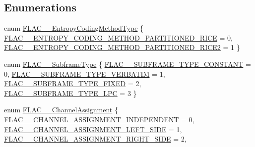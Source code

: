 \subsection*{Enumerations}
\begin{DoxyCompactItemize}
\item 
enum \hyperlink{group__flac__format_ga951733d2ea01943514290012cd622d3a}{F\+L\+A\+C\+\_\+\+\_\+\+Entropy\+Coding\+Method\+Type} \{ \hyperlink{group__flac__format_gga951733d2ea01943514290012cd622d3aa5253f8b8edc61220739f229a299775dd}{F\+L\+A\+C\+\_\+\+\_\+\+E\+N\+T\+R\+O\+P\+Y\+\_\+\+C\+O\+D\+I\+N\+G\+\_\+\+M\+E\+T\+H\+O\+D\+\_\+\+P\+A\+R\+T\+I\+T\+I\+O\+N\+E\+D\+\_\+\+R\+I\+CE} = 0, 
\hyperlink{group__flac__format_gga951733d2ea01943514290012cd622d3aa202960a608ee91f9f11c2575b9ecc5aa}{F\+L\+A\+C\+\_\+\+\_\+\+E\+N\+T\+R\+O\+P\+Y\+\_\+\+C\+O\+D\+I\+N\+G\+\_\+\+M\+E\+T\+H\+O\+D\+\_\+\+P\+A\+R\+T\+I\+T\+I\+O\+N\+E\+D\+\_\+\+R\+I\+C\+E2} = 1
 \}
\item 
enum \hyperlink{group__flac__format_ga1f431eaf213e74d7747589932d263348}{F\+L\+A\+C\+\_\+\+\_\+\+Subframe\+Type} \{ \hyperlink{group__flac__format_gga1f431eaf213e74d7747589932d263348a9bf56d836aeffb11d614e29ea1cdf2a9}{F\+L\+A\+C\+\_\+\+\_\+\+S\+U\+B\+F\+R\+A\+M\+E\+\_\+\+T\+Y\+P\+E\+\_\+\+C\+O\+N\+S\+T\+A\+NT} = 0, 
\hyperlink{group__flac__format_gga1f431eaf213e74d7747589932d263348a8520596ef07d6c8577f07025f137657b}{F\+L\+A\+C\+\_\+\+\_\+\+S\+U\+B\+F\+R\+A\+M\+E\+\_\+\+T\+Y\+P\+E\+\_\+\+V\+E\+R\+B\+A\+T\+IM} = 1, 
\hyperlink{group__flac__format_gga1f431eaf213e74d7747589932d263348a6b3cce73039a513f9afefdc8e4f664a5}{F\+L\+A\+C\+\_\+\+\_\+\+S\+U\+B\+F\+R\+A\+M\+E\+\_\+\+T\+Y\+P\+E\+\_\+\+F\+I\+X\+ED} = 2, 
\hyperlink{group__flac__format_gga1f431eaf213e74d7747589932d263348a31437462c3e4c3a5a214a91eff8cc3af}{F\+L\+A\+C\+\_\+\+\_\+\+S\+U\+B\+F\+R\+A\+M\+E\+\_\+\+T\+Y\+P\+E\+\_\+\+L\+PC} = 3
 \}
\item 
enum \hyperlink{group__flac__format_ga79855f8525672e37f299bbe02952ef9c}{F\+L\+A\+C\+\_\+\+\_\+\+Channel\+Assignment} \{ \hyperlink{group__flac__format_gga79855f8525672e37f299bbe02952ef9ca3c554e4c8512c2de31dfd3305f8b31b3}{F\+L\+A\+C\+\_\+\+\_\+\+C\+H\+A\+N\+N\+E\+L\+\_\+\+A\+S\+S\+I\+G\+N\+M\+E\+N\+T\+\_\+\+I\+N\+D\+E\+P\+E\+N\+D\+E\+NT} = 0, 
\hyperlink{group__flac__format_gga79855f8525672e37f299bbe02952ef9ca28d41295b20593561dc9934cc977d5cb}{F\+L\+A\+C\+\_\+\+\_\+\+C\+H\+A\+N\+N\+E\+L\+\_\+\+A\+S\+S\+I\+G\+N\+M\+E\+N\+T\+\_\+\+L\+E\+F\+T\+\_\+\+S\+I\+DE} = 1, 
\hyperlink{group__flac__format_gga79855f8525672e37f299bbe02952ef9cad155b61582140b2b90362005f1a93e2e}{F\+L\+A\+C\+\_\+\+\_\+\+C\+H\+A\+N\+N\+E\+L\+\_\+\+A\+S\+S\+I\+G\+N\+M\+E\+N\+T\+\_\+\+R\+I\+G\+H\+T\+\_\+\+S\+I\+DE} = 2, 

\end{DoxyCompactItemize}
